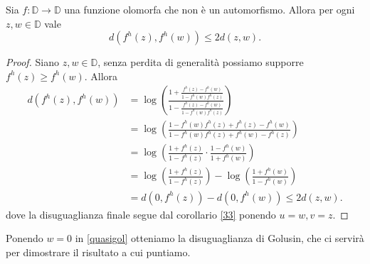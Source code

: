 \begin{cor} \label{quasigolusin}
  Sia $f:\mathbb{D} \longrightarrow \mathbb{D}$ una funzione olomorfa che non è un automorfismo. Allora per ogni $z, w \in \mathbb{D}$ vale
  \begin{equation} \label{quasigol}
    d(f^h(z), f^h(w)) \le 2d(z,w).
  \end{equation}
\end{cor}

\begin{proof}
  Siano $z, w \in \mathbb{D}$, senza perdita di generalità possiamo supporre $f^h(z) \ge f^h(w)$. Allora
  \begin{align*}
    d(f^h(z), f^h(w)) & =\log\left(\frac{1+\frac{f^h(z)-f^h(w)}{1-f^h(w)f^h(z)}}{1-\frac{f^h(z)-f^h(w)}{1-f^h(w)f^h(z)}}\right) \\
    & =\log\left(\frac{1-f^h(w)f^h(z)+f^h(z)-f^h(w)}{1-f^h(w)f^h(z)+f^h(w)-f^h(z)}\right) \\
    & =\log\left(\frac{1+f^h(z)}{1-f^h(z)}\cdot\frac{1-f^h(w)}{1+f^h(w)}\right) \\
    & =\log\left(\frac{1+f^h(z)}{1-f^h(z)}\right)-\log\left(\frac{1+f^h(w)}{1-f^h(w)}\right) \\
    & =d(0,f^h(z))-d(0,f^h(w)) \le 2d(z,w).
  \end{align*}
  dove la disuguaglianza finale segue dal corollario \ref{33} ponendo $u=w, v=z$.
\end{proof}

Ponendo $w=0$ in \eqref{quasigol} otteniamo la disuguaglianza di Golusin, che ci servirà per dimostrare il risultato a cui puntiamo.
